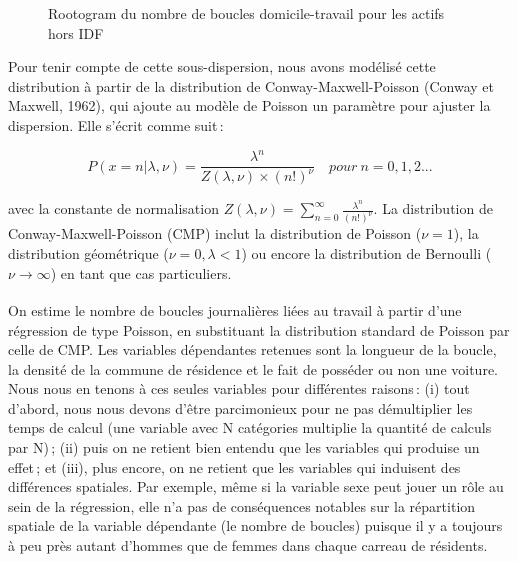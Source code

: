\documentclass[
  9pt,
  a4paper,
  DIV=11]{scrreprt}
\begin{document}
\begin{figure}[htb]

\caption{\label{fig-distrib-bcl}Rootogram du nombre de boucles
domicile-travail pour les actifs hors IDF}


\end{figure}%

Pour tenir compte de cette sous-dispersion, nous avons modélisé cette
distribution à partir de la distribution de Conway-Maxwell-Poisson
(Conway et Maxwell, 1962), qui ajoute au modèle de Poisson un paramètre
pour ajuster la dispersion. Elle s'écrit comme suit\,:

\[
P(x=n|\lambda,\nu) = \frac{\lambda^n}{Z(\lambda, \nu) \times (n!)^\nu} \quad pour\ n=0,1,2...
\]

avec la constante de normalisation
\(Z(\lambda, \nu) = \sum_{n=0}^\infty \frac{\lambda^n}{(n!)^\nu}\). La
distribution de Conway-Maxwell-Poisson (CMP) inclut la distribution de
Poisson (\(\nu=1\)), la distribution géométrique (\(\nu=0, \lambda<1\))
ou encore la distribution de Bernoulli (\(\nu \xrightarrow[]{}\infty\))
en tant que cas particuliers.

On estime le nombre de boucles journalières liées au travail à partir
d'une régression de type Poisson, en substituant la distribution
standard de Poisson par celle de CMP. Les variables dépendantes retenues
sont la longueur de la boucle, la densité de la commune de résidence et
le fait de posséder ou non une voiture. Nous nous en tenons à ces seules
variables pour différentes raisons\,: (i) tout d'abord, nous nous devons
d'être parcimonieux pour ne pas démultiplier les temps de calcul (une
variable avec N catégories multiplie la quantité de calculs par N)\,;
(ii) puis on ne retient bien entendu que les variables qui produise un
effet\,; et (iii), plus encore, on ne retient que les variables qui
induisent des différences spatiales. Par exemple, même si la variable
sexe peut jouer un rôle au sein de la régression, elle n'a pas de
conséquences notables sur la répartition spatiale de la variable
dépendante (le nombre de boucles) puisque il y a toujours à peu près
autant d'hommes que de femmes dans chaque carreau de résidents.
\end{document}
